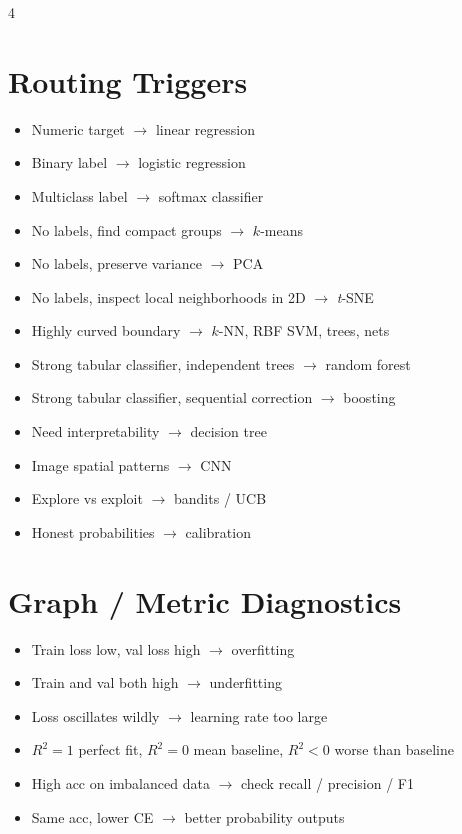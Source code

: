\documentclass[11pt,landscape]{article}
\begin{document}
\begin{multicols}{4}
		\section{Routing Triggers}
		\begin{itemize}
			\item Numeric target $\rightarrow$ linear regression
			\item Binary label $\rightarrow$ logistic regression
			\item Multiclass label $\rightarrow$ softmax classifier
			\item No labels, find compact groups $\rightarrow$ $k$-means
			\item No labels, preserve variance $\rightarrow$ PCA
			\item No labels, inspect local neighborhoods in 2D $\rightarrow$ \textit{t}-SNE
			\item Highly curved boundary $\rightarrow$ $k$-NN, RBF SVM, trees, nets
			\item Strong tabular classifier, independent trees $\rightarrow$ random forest
			\item Strong tabular classifier, sequential correction $\rightarrow$ boosting
			\item Need interpretability $\rightarrow$ decision tree
			\item Image spatial patterns $\rightarrow$ CNN
			\item Explore vs exploit $\rightarrow$ bandits / UCB
			\item Honest probabilities $\rightarrow$ calibration
		\end{itemize}
		
		\section{Graph / Metric Diagnostics}
		\begin{itemize}
			\item Train loss low, val loss high $\rightarrow$ overfitting
			\item Train and val both high $\rightarrow$ underfitting
			\item Loss oscillates wildly $\rightarrow$ learning rate too large
			\item $R^2=1$ perfect fit, $R^2=0$ mean baseline, $R^2<0$ worse than baseline
			\item High acc on imbalanced data $\rightarrow$ check recall / precision / F1
			\item Same acc, lower CE $\rightarrow$ better probability outputs
		\end{itemize}
		

\end{multicols}
\end{document}
